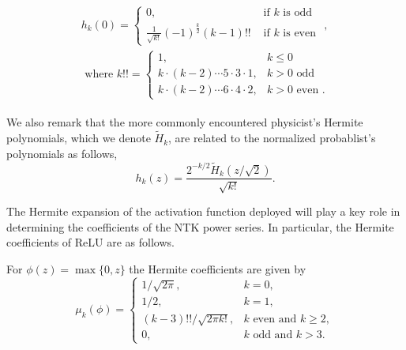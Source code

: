 \begin{align}
	\begin{array}{c}
		h_{k}(0)=\left\{\begin{array}{ll}
			0, & \text { if } k \text { is odd } \\
			\frac{1}{\sqrt{k !}}(-1)^{\frac{k}{2}}(k-1) ! ! & \text { if } k \text { is even }
		\end{array}\right., \\ \text{ where }
		k ! !=\left\{\begin{array}{ll}
			1, & k \leq 0 \\
			k \cdot(k-2) \cdots 5 \cdot 3 \cdot 1, & k>0 \text { odd } \\
			k \cdot(k-2) \cdots 6 \cdot 4 \cdot 2, & k>0 \text { even }.
		\end{array}\right.
	\end{array}\label{eq:HP3}
\end{align}

We also remark that the more commonly encountered physicist's Hermite polynomials, which we denote $\tilde{H}_k$, are related to the normalized probablist's polynomials as follows,
\[
    h_k(z) = \frac{2^{-k/2}\tilde{H}_k(z/\sqrt{2})}{\sqrt{k!}}.
\]

The Hermite expansion of the activation function deployed will play a key role in determining the coefficients of the NTK power series. In particular, the Hermite coefficients of ReLU are as follows.

\begin{lemma} \label{lemma:hermite_relu}
     \cite{dual_view} For $\phi(z) = \max\{0,z\}$ the Hermite coefficients are given by
     \begin{equation}
         \mu_k(\phi) =
         \begin{cases}
            1/\sqrt{2 \pi}, &\text{$k=0$},\\
            1/2, &\text{$k=1$},\\
            (k-3)!!/\sqrt{2\pi k!}, &\text{$k$ even and $k\geq 2$},\\
            0 , &\text{$k$ odd and $k>3$}.
         \end{cases}
     \end{equation}
\end{lemma}
